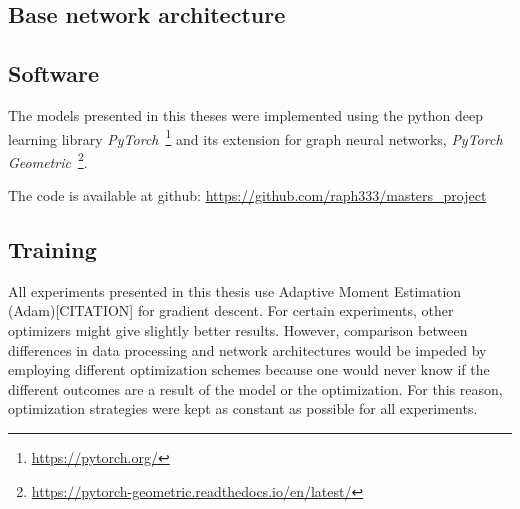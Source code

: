 
\subsection{Base network architecture}
\label{sec:base-architecture}



\subsection{Software}

The models presented in this theses were implemented using the python deep learning library \textit{PyTorch}~\footnote{\url{https://pytorch.org/}} and its extension for graph neural networks, \textit{PyTorch Geometric}~\footnote{\url{https://pytorch-geometric.readthedocs.io/en/latest/}}.

The code is available at github: \url{https://github.com/raph333/masters_project}



\subsection{Training}
\label{sec:training}

All experiments presented in this thesis use Adaptive Moment Estimation (Adam)[CITATION] for gradient descent. For certain experiments, other optimizers might give slightly better results. However, comparison between differences in data processing and network architectures would be impeded by employing different optimization schemes because one would never know if the different outcomes are a result of the model or the optimization. For this reason, optimization strategies were kept as constant as possible for all experiments.

